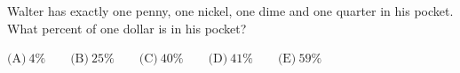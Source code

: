 Walter has exactly one penny, one nickel, one dime and one quarter in his pocket. What percent of one dollar is in his pocket?

$\text{(A)}\ 4\%\qquad\text{(B)}\ 25\%\qquad\text{(C)}\ 40\%\qquad\text{(D)}\ 41\%\qquad\text{(E)}\ 59\%$

